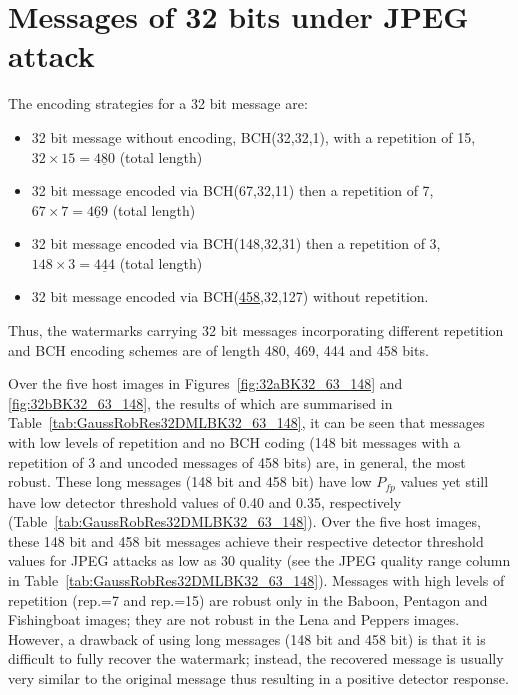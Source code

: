 \documentclass[12pt]{report}
\begin{document}
\section{Messages of 32 bits under JPEG attack} 
\label{sec:msg32}
The encoding strategies for a 32 bit message are:
\begin{itemize}
        \item 32 bit message without encoding, BCH(32,32,1), with a repetition of 15, $32 \times 15 = \underline{480}$ (total length)
        \item 32 bit message encoded via BCH(67,32,11) then a repetition of 7, $67 \times 7 = \underline{469}$ (total length)
        \item 32 bit message encoded via BCH(148,32,31) then a repetition of 3, $148 \times 3 = \underline{444}$ (total length)
        \item 32 bit message encoded via BCH(\underline{458},32,127) without repetition.
\end{itemize}
Thus, the watermarks carrying 32 bit messages incorporating different repetition and BCH encoding schemes are of length
480, 469, 444 and 458 bits.

Over the five host images in Figures~\ref{fig:32aBK32_63_148} and \ref{fig:32bBK32_63_148}, 
the results of which are summarised in Table~\ref{tab:GaussRobRes32DMLBK32_63_148},
it can be seen that 
messages with low levels of repetition and no 
BCH coding (148 bit messages with a repetition of 3 and uncoded messages of 458 bits)
are, in general, the most robust. These long messages (148 bit and 458 bit) have low $P_{fp}$ values yet still
have low detector threshold values of 0.40 and 0.35, respectively (Table~\ref{tab:GaussRobRes32DMLBK32_63_148}).
Over the five host images, these 148 bit and 458 bit messages achieve their respective detector threshold values
for JPEG attacks as low as 30 quality (see the JPEG quality range column in Table~\ref{tab:GaussRobRes32DMLBK32_63_148}).
Messages with high levels of repetition (rep.=7 and rep.=15) are robust only in the Baboon, Pentagon and Fishingboat images;
they are not robust in the Lena and Peppers images.
However, a drawback of using long messages (148 bit and 458 bit) is that it is difficult to fully recover the watermark; instead, the 
recovered message is usually very similar to the original message thus resulting in a positive detector response.
\end{document}
